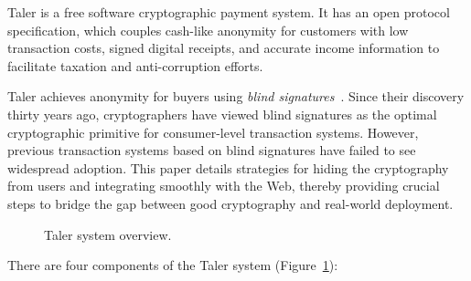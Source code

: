 \documentclass{llncs}
\begin{document}
Taler is a free software cryptographic payment system. It has an open
protocol specification, which couples cash-like anonymity for customers
with low transaction costs, signed digital
receipts, and accurate income information to facilitate taxation and
anti-corruption efforts.

Taler achieves anonymity for buyers using {\em blind
signatures}~\cite{chaum1983blind}.  Since their discovery thirty years
ago, cryptographers have viewed blind signatures as the optimal
cryptographic primitive for consumer-level transaction systems.
However, previous transaction systems based on blind signatures have
failed to see widespread adoption.  This paper details strategies for
hiding the cryptography from users and integrating smoothly with the
Web, thereby providing crucial steps to bridge the gap between good
cryptography and real-world deployment.


\begin{figure}[b!]
\centering
{}
\caption{Taler system overview.}
\label{fig:system}
\end{figure}


There are four components of the Taler system (Figure~\ref{fig:system}):
\end{document}

